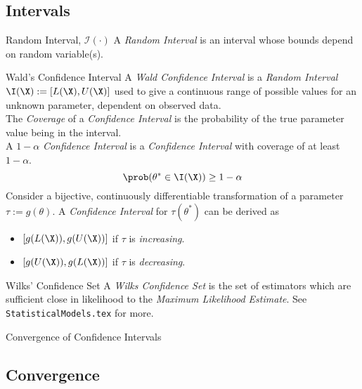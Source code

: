 \documentclass[11pt,a4paper]{article}
\begin{document}
\subsection{Intervals}

\begin{definition}{Random Interval, $\mathcal{I}(\cdot)$}
  A \textit{Random Interval} is an interval whose bounds depend on random variable(s).\\
\end{definition}

\begin{definition}{Wald's Confidence Interval}
  A \textit{Wald Confidence Interval} is a \textit{Random Interval} $\I(\X):=[L(\X),U(\X)]$ used to give a continuous range of possible values for an unknown parameter, dependent on observed data.\\
  The \textit{Coverage} of a \textit{Confidence Interval} is the probability of the true parameter value being in the interval.\\
  A $1-\alpha$ \textit{Confidence Interval} is a \textit{Confidence Interval} with coverage of at least $1-\alpha$.
  \[ \prob(\theta^*\in\I(\X))\geq1-\alpha \]
  Consider a bijective, continuously differentiable transformation of a parameter $\tau:=g(\theta)$. A \textit{Confidence Interval} for $\tau(\theta^*)$ can be derived as
  \begin{itemize}
    \item $[g(L(\X)),g(U(\X))]$ if $\tau$ is \textit{increasing}.
    \item $[g(U(\X)),g(L(\X))]$ if $\tau$ is \textit{decreasing}.
  \end{itemize}
\end{definition}

\begin{definition}{Wilks' Confidence Set}
  A \textit{Wilks Confidence Set} is the set of estimators which are sufficient close in likelihood to the \textit{Maximum Likelihood Estimate}. See \texttt{StatisticalModels.tex} for more.
\end{definition}

\begin{theorem}{Convergence of Confidence Intervals}

\end{theorem}

\subsection{Convergence}
\end{document}
